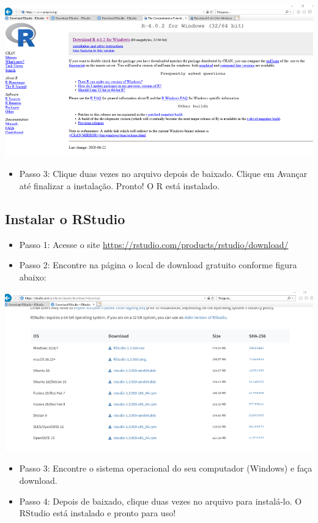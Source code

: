 \documentclass[
  10pt,
  brazil,
  a4paper,
  twoside, notitlepage, openright]{book}
\providecommand{\tightlist}{%
  \setlength{\itemsep}{0pt}\setlength{\parskip}{0pt}}
\begin{document}
\includegraphics[width=13.54in]{img/inst_1_rwindows}

\begin{itemize}
\tightlist
\item
  Passo 3: Clique duas vezes no arquivo depois de baixado. Clique em Avançar até finalizar a instalação. Pronto! O R está instalado.
\end{itemize}

\hypertarget{instalar-o-rstudio-2}{%
\subsection{Instalar o RStudio}\label{instalar-o-rstudio-2}}

\begin{itemize}
\tightlist
\item
  Passo 1: Acesse o site \url{https://rstudio.com/products/rstudio/download/}\\
\item
  Passo 2: Encontre na página o local de download gratuito conforme figura abaixo:
\end{itemize}

\includegraphics[width=13.54in]{img/inst_1_rstudio}

\begin{itemize}
\tightlist
\item
  Passo 3: Encontre o sistema operacional do seu computador (Windows) e faça download.
\item
  Passo 4: Depois de baixado, clique duas vezes no arquivo para instalá-lo. O RStudio está instalado e pronto para uso!
\end{itemize}
\end{document}
